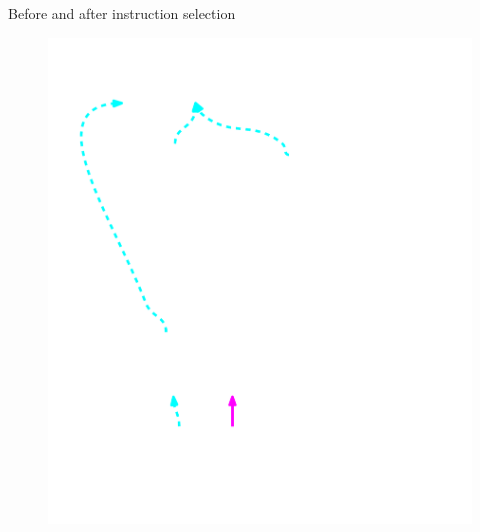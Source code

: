 \begin{frame}{Before and after instruction selection}
\begin{minipage}[t]{0.49\linewidth}
\begin{figure}
        \includegraphics[width = 1.00\textwidth]{examples/ex1b/ex1b-post-isel.pdf}
    \end{figure}
\end{minipage}


\end{frame}


